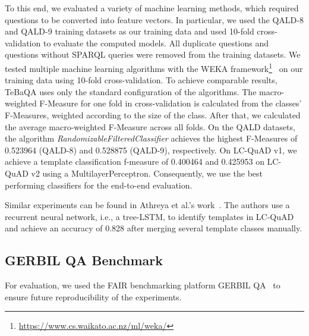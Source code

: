 \documentclass{IOS-Book-Article}
\begin{document}
To this end, we evaluated a variety of machine learning methods, which required questions to be converted into feature vectors.
In particular, we used the QALD-8 and QALD-9 training datasets as our training data and used 10-fold cross-validation to evaluate the computed models. 
All duplicate questions and questions without SPARQL queries were removed from the training datasets.
We tested multiple machine learning algorithms with the WEKA framework\footnote{\url{https://www.cs.waikato.ac.nz/ml/weka/}}~\cite{eibe2016weka} on our training data using 10-fold cross-validation.
To achieve comparable results, TeBaQA uses only the standard configuration of the algorithms.
The macro-weighted F-Measure for one fold in cross-validation is calculated from the classes' F-Measures, weighted according to the size of the class. 
After that, we calculated the average macro-weighted F-Measure across all folds. 
On the QALD datasets, the algorithm \textit{RandomizableFilteredClassifier} achieves the highest F-Measures of 0.523964 (QALD-8) and 0.528875 (QALD-9), respectively. 
On LC-QuAD v1, we achieve a template classification f-measure of 0.400464 and 0.425953 on LC-QuAD v2
using a MultilayerPerceptron. 
Consequently, we use the best performing classifiers for the end-to-end evaluation.

Similar experiments can be found in Athreya et al.'s work~\cite{athreya2020templatebased}. 
The authors use a recurrent neural network, i.e., a tree-LSTM, to identify templates in LC-QuAD and achieve an accuracy of 0.828 after merging several template classes manually.


\subsection{GERBIL QA Benchmark}\label{sec:gerbil-benchmark}

For evaluation, we used the FAIR benchmarking platform GERBIL QA~\cite{DBLP:journals/semweb/UsbeckRHCHNDU19} to ensure future reproducibility of the experiments.
\end{document}
